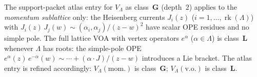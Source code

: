\begin{remark}%
\label{rem:lattice-atlas-correction}%
%
The support-packet atlas entry for $V_\Lambda$ as
class~$\mathbf{G}$ (depth~$2$) applies to the
\emph{momentum sublattice} only: the Heisenberg
currents $J_i(z)$ ($i = 1, \ldots, \operatorname{rk}(\Lambda)$)
with $J_i(z)\, J_j(w) \sim (\alpha_i, \alpha_j)/(z-w)^2$
have scalar OPE residues and no simple pole. The
full lattice VOA with vertex operators $e^\alpha$
($\alpha \in \Lambda$) is class~$\mathbf{L}$ whenever
$\Lambda$ has roots: the simple-pole OPE
$e^\alpha(z)\,e^{-\alpha}(w) \sim \cdots + (\alpha \cdot J)/(z-w)$
introduces a Lie bracket. The atlas entry is refined
accordingly: $V_\Lambda(\mathrm{mom.})$ is
class~$\mathbf{G}$; $V_\Lambda(\mathrm{v.o.})$ is
class~$\mathbf{L}$.
\end{remark}

